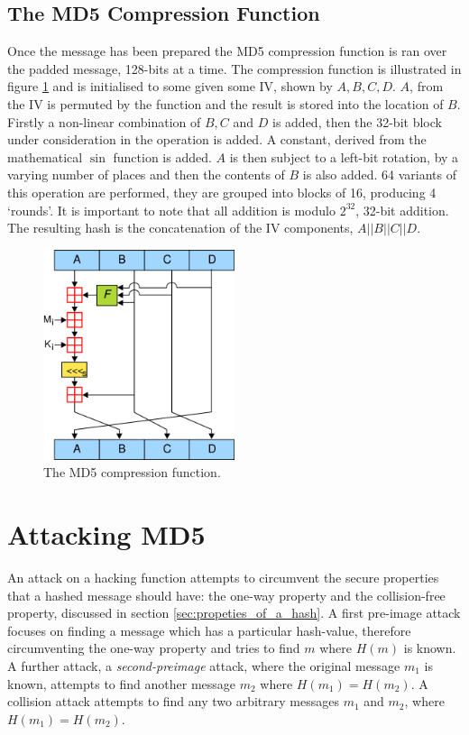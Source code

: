 \documentclass[a4paper,12pt]{article}
\newcommand{\hash}[1]{\ensuremath{H(#1)}}
\begin{document}
\subsection{The MD5 Compression Function}
Once the message has been prepared the MD5 compression function is ran over the padded message, 128-bits at a time. The compression function is illustrated in figure \ref{fig:md5comp} and is initialised to some given some IV, shown by $A, B, C, D$. $A$, from the IV is permuted by the function and the result is stored into the location of $B$. Firstly a non-linear combination of $B, C$ and $D$ is added, then the 32-bit block under consideration in the operation is added. A constant, derived from the mathematical $\sin$ function is added. $A$ is then subject to a left-bit rotation, by a varying number of places and then the contents of $B$ is also added. 64 variants of this operation are performed, they are grouped into blocks of 16, producing 4 `rounds'. It is important to note that all addition is modulo $2^{32}$, 32-bit addition.
The resulting hash is the concatenation of the IV components, $A || B || C || D$.
\begin{figure}
    \centering
    \includegraphics[width=0.5\textwidth]{md5.png}
    \caption{The MD5 compression function.}
    \label{fig:md5comp}
\end{figure}

\section{Attacking MD5}
An attack on a hacking function attempts to circumvent the secure properties that a hashed message should have: the one-way property and the collision-free property, discussed in section \ref{sec:propeties_of_a_hash}.
A first pre-image attack focuses on finding a message which has a particular hash-value, therefore circumventing the one-way property and tries to find $m$ where $\hash{m}$ is known. A further attack, a \emph{second-preimage} attack, where the original message $m_1$ is known, attempts to find another message $m_2$ where $\hash{m_1} = \hash{m_2}$.
A collision attack attempts to find any two arbitrary messages $m_1$ and $m_2$, where $\hash{m_1} = \hash{m_2}$.
\end{document}
